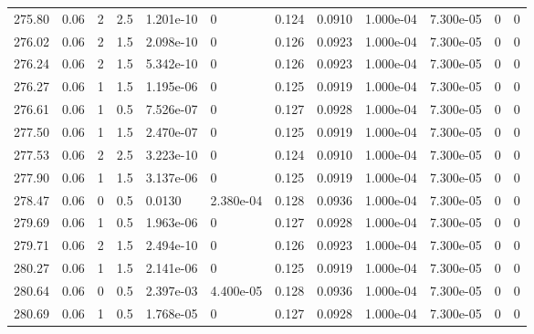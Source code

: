 \documentclass[preview]{standalone}
\begin{document}
{{{{{{{{{\begin{tabular}{L{1.2cm}C{1.2cm} C{0.3cm}C{0.5cm} C{1.4cm}C{1.4cm} C{1.4cm}C{1.4cm} C{1.6cm}C{1.6cm} C{1.6cm}C{1.6cm}}
  275.80  &  0.06  & 2     & 2.5 &  1.201e-10  & 0  &  0.124&   0.0910& 1.000e-04 & 7.300e-05   &  0 & 0  \\ 
  276.02  &  0.06  & 2     & 1.5 &  2.098e-10  & 0  &  0.126&   0.0923& 1.000e-04 & 7.300e-05   &  0 & 0  \\ 
  276.24  &  0.06  & 2     & 1.5 &  5.342e-10  & 0  &  0.126&   0.0923& 1.000e-04 & 7.300e-05   &  0 & 0  \\ 
  276.27  &  0.06  & 1     & 1.5 &  1.195e-06  & 0  &  0.125&   0.0919& 1.000e-04 & 7.300e-05   &  0 & 0  \\ 
  276.61  &  0.06  & 1     & 0.5 &  7.526e-07  & 0  &  0.127&   0.0928& 1.000e-04 & 7.300e-05   &  0 & 0  \\ 
  277.50  &  0.06  & 1     & 1.5 &  2.470e-07  & 0  &  0.125&   0.0919& 1.000e-04 & 7.300e-05   &  0 & 0  \\ 
  277.53  &  0.06  & 2     & 2.5 &  3.223e-10  & 0  &  0.124&   0.0910& 1.000e-04 & 7.300e-05   &  0 & 0  \\ 
  277.90  &  0.06  & 1     & 1.5 &  3.137e-06  & 0  &  0.125&   0.0919& 1.000e-04 & 7.300e-05   &  0 & 0  \\ 
  278.47  &  0.06  & 0     & 0.5 &  0.0130  & 2.380e-04  &  0.128&   0.0936& 1.000e-04 & 7.300e-05   &  0 & 0  \\ 
  279.69  &  0.06  & 1     & 0.5 &  1.963e-06  & 0  &  0.127&   0.0928& 1.000e-04 & 7.300e-05   &  0 & 0  \\ 
  279.71  &  0.06  & 2     & 1.5 &  2.494e-10  & 0  &  0.126&   0.0923& 1.000e-04 & 7.300e-05   &  0 & 0  \\ 
  280.27  &  0.06  & 1     & 1.5 &  2.141e-06  & 0  &  0.125&   0.0919& 1.000e-04 & 7.300e-05   &  0 & 0  \\ 
  280.64  &  0.06  & 0     & 0.5 &  2.397e-03  & 4.400e-05  &  0.128&   0.0936& 1.000e-04 & 7.300e-05   &  0 & 0  \\ 
  280.69  &  0.06  & 1     & 0.5 &  1.768e-05  & 0  &  0.127&   0.0928& 1.000e-04 & 7.300e-05   &  0 & 0  \\ 
\hline 
\end{tabular} 

}}}}}}}}}
\end{document}
